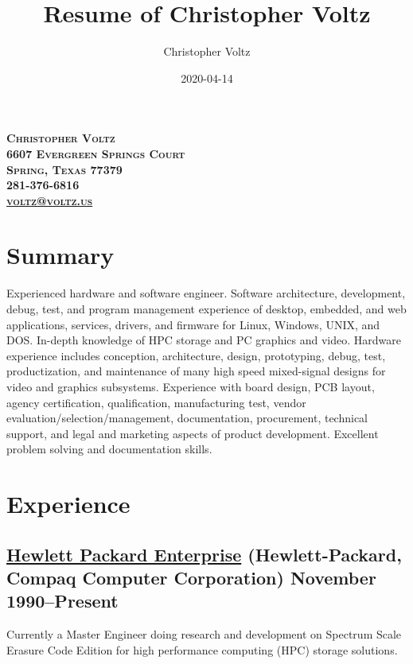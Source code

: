 \documentclass[10pt,letterpaper,oneside]{report}
\title{Resume of Christopher Voltz}
\author{Christopher Voltz}
\date{2020-04-14}
\begin{document}
\begin{center}
  \textbf{
    \textsc{
      Christopher Voltz\\
      6607 Evergreen Springs Court\\
      Spring, Texas 77379\\
      281-376-6816\\
      \href{mailto:voltz@voltz.us?subject=Resume}{voltz@voltz.us}
    }
  }
\end{center}

\section{Summary}

Experienced hardware and software engineer. Software architecture, development,
debug, test, and program management experience of desktop, embedded, and web
applications, services, drivers, and firmware for Linux, Windows, UNIX, and DOS.
In-depth knowledge of HPC storage and PC graphics and video.
Hardware experience includes conception, architecture, design, prototyping,
debug, test, productization, and maintenance of many high speed mixed-signal
designs for video and graphics subsystems. Experience with board design, PCB
layout, agency certification, qualification, manufacturing test, vendor
evaluation/selection/management, documentation, procurement, technical support,
and legal and marketing aspects of product development. Excellent problem
solving and documentation skills.

\section{Experience}

\subsection[Hewlett Packard Enterprise]{
  \href{http://www.hpe.com/}{Hewlett Packard Enterprise}
  {\footnotesize (Hewlett-Packard, Compaq Computer Corporation)}
  \hfill November 1990--Present
}

\vspace{-1.5ex}

Currently a Master Engineer doing research and development on Spectrum Scale
Erasure Code Edition for high performance computing (HPC) storage solutions.
\end{document}
